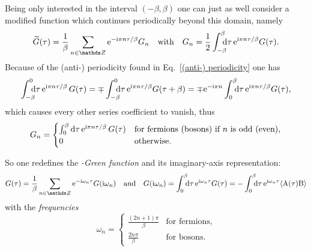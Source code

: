 Being only interested in the interval $(-\beta, \beta)$ one can just as well
consider a modified  function which continues periodically beyond
this domain, namely
%
\begin{equation*}
    \widetilde G(\tau) = \frac 1 \beta \sum_{n \in \mathds Z}
        \E^{-\I \pi n \tau / \beta} G_n
    \quad \text{with} \quad
    G_n = \frac 1 2 \int \from{-\beta} \till \beta \D \tau \,
        \E^{\I \pi n \tau / \beta} G(\tau).
\end{equation*}
%
Because of the (anti-) periodicity found in Eq.~\ref{(anti-) periodicity} one
has
%
\begin{equation*}
    \int \from{-\beta} \till 0 \D \tau \, \E^{\I \pi n \tau / \beta} \, G(\tau)
    = \mp \int \from{-\beta} \till 0 \D \tau \,
        \E^{\I \pi n \tau / \beta} G(\tau + \beta)
    = \mp \E^{-\I \pi n} \int \from 0 \till \beta \D \tau \,
        \E^{\I \pi n \tau / \beta} G(\tau),
\end{equation*}
%
which causes every other series coefficient to vanish, thus
%
\begin{equation*}
    G_n =
    \begin{cases}
        \int_0^\beta \mathrm d \tau \, \mathrm e^{\mathrm i \pi n \tau / \beta} \, G(\tau)
        & \text{for fermions (bosons) if $n$ is odd (even),} \\ 0
        & \text{otherwise.}
    \end{cases}
\end{equation*}

So one redefines the \emph{-Green function} and its
imaginary-axis representation:
%
\begin{equation} \label{Matsubara-Green function}
    G(\tau) = \frac 1 \beta \sum_{n \in \mathds Z}
        \E^{-\I \omega_n \tau} G(\I \omega_n)
    \quad \text{and} \quad
    G(\I \omega_n) = \int \from 0 \till \beta \D \tau \,
        \E^{\I \omega_n \tau} G(\tau)
    = -\int \from 0 \till \beta \D \tau \,
        \E^{\I \omega_n \tau} \av{\op A(\tau) \op B}
\end{equation}
%
with the \emph{ frequencies}
%
\begin{equation*}
    \omega_n =
    \begin{cases}
        \frac{(2 n + 1) \pi} \beta & \text{for fermions}, \\
        \frac{2 n \pi} \beta & \text{for bosons.}
    \end{cases}
\end{equation*}

